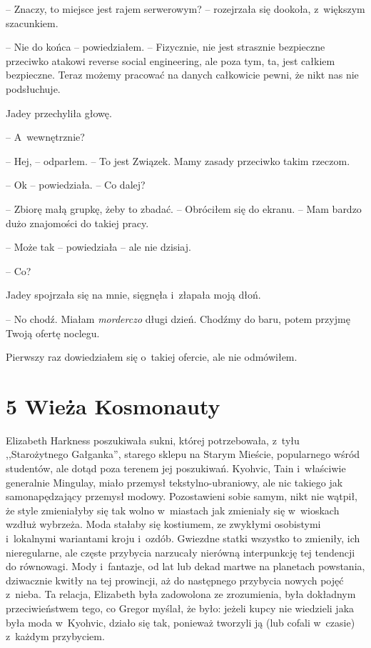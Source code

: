 \documentclass[oneside,polish,12pt,sfheadings]{mwbk}
\begin{document}
-- Znaczy, to miejsce jest rajem serwerowym? -- rozejrzała się dookoła, z~większym szacunkiem.

-- Nie do końca -- powiedziałem. -- Fizycznie, nie jest strasznie
bezpieczne przeciwko atakowi reverse social engineering, ale poza tym,
ta, jest całkiem bezpieczne. Teraz możemy pracować na danych całkowicie
pewni, że nikt nas nie podsłuchuje.

Jadey przechyliła głowę. 

-- A~wewnętrznie?

-- Hej, -- odparłem. -- To jest Związek. Mamy zasady przeciwko takim
rzeczom.

-- Ok -- powiedziała. -- Co dalej?

-- Zbiorę małą grupkę, żeby to zbadać. -- Obróciłem się do ekranu. -- Mam
bardzo dużo znajomości do takiej pracy.

-- Może tak -- powiedziała -- ale nie dzisiaj.

-- Co?

Jadey spojrzała się na mnie, sięgnęła i~złapała moją dłoń. 

-- No chodź. Miałam \emph{morderczo }długi dzień. Chodźmy do baru, potem
przyjmę Twoją ofertę noclegu.

Pierwszy raz dowiedziałem się o~takiej ofercie, ale nie odmówiłem.

\chapter[Wieża Kosmonauty]{5 Wieża Kosmonauty}

Elizabeth Harkness poszukiwała sukni, której potrzebowała, z~tyłu
,,Starożytnego Gałganka'', starego sklepu na Starym Mieście, popularnego
wśród studentów, ale dotąd poza terenem jej poszukiwań. Kyohvic, Tain i~właściwie generalnie Mingulay, miało przemysł tekstylno-ubraniowy, ale
nic takiego jak samonapędzający przemysł modowy. Pozostawieni sobie
samym, nikt nie wątpił, że style zmieniałyby się tak wolno w~miastach
jak zmieniały się w~wioskach wzdłuż wybrzeża. Moda stałaby się
kostiumem, ze zwykłymi osobistymi i~lokalnymi wariantami kroju i~ozdób.
Gwiezdne statki wszystko to zmieniły, ich nieregularne, ale częste
przybycia narzucały nierówną interpunkcję tej tendencji do równowagi.
Mody i~fantazje, od lat lub dekad martwe na planetach powstania,
dziwacznie kwitły na tej prowincji, aż do następnego przybycia nowych
pojęć z~nieba. Ta relacja, Elizabeth była zadowolona ze zrozumienia,
była dokładnym przeciwieństwem tego, co Gregor myślał, że było: jeżeli
kupcy nie wiedzieli jaka była moda w~Kyohvic, działo się tak, ponieważ
tworzyli ją (lub cofali w~czasie) z~każdym przybyciem.
\end{document}
